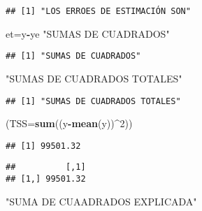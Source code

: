 \documentclass[
]{article}
\newenvironment{Shaded}{\begin{snugshade}}{\end{snugshade}}
\newcommand{\DataTypeTok}[1]{\textcolor[rgb]{0.13,0.29,0.53}{#1}}
\newcommand{\DecValTok}[1]{\textcolor[rgb]{0.00,0.00,0.81}{#1}}
\newcommand{\KeywordTok}[1]{\textcolor[rgb]{0.13,0.29,0.53}{\textbf{#1}}}
\newcommand{\NormalTok}[1]{#1}
\newcommand{\OperatorTok}[1]{\textcolor[rgb]{0.81,0.36,0.00}{\textbf{#1}}}
\newcommand{\StringTok}[1]{\textcolor[rgb]{0.31,0.60,0.02}{#1}}
\begin{document}
\begin{verbatim}
## [1] "LOS ERROES DE ESTIMACIÓN SON"
\end{verbatim}

\begin{Shaded}
\begin{Highlighting}[]
\NormalTok{et=y}\OperatorTok{-}\NormalTok{ye}
\StringTok{"SUMAS DE CUADRADOS"}
\end{Highlighting}
\end{Shaded}

\begin{verbatim}
## [1] "SUMAS DE CUADRADOS"
\end{verbatim}

\begin{Shaded}
\begin{Highlighting}[]
\StringTok{"SUMAS DE CUADRADOS TOTALES"}
\end{Highlighting}
\end{Shaded}

\begin{verbatim}
## [1] "SUMAS DE CUADRADOS TOTALES"
\end{verbatim}

\begin{Shaded}
\begin{Highlighting}[]
\NormalTok{(}\DataTypeTok{TSS=}\KeywordTok{sum}\NormalTok{((y}\OperatorTok{-}\KeywordTok{mean}\NormalTok{(y))}\OperatorTok{^}\DecValTok{2}\NormalTok{))}
\end{Highlighting}
\end{Shaded}

\begin{verbatim}
## [1] 99501.32
\end{verbatim}

\begin{Shaded}
\end{Shaded}

\begin{verbatim}
##          [,1]
## [1,] 99501.32
\end{verbatim}

\begin{Shaded}
\begin{Highlighting}[]
\StringTok{"SUMA DE CUAADRADOS EXPLICADA"}
\end{Highlighting}
\end{Shaded}
\end{document}
